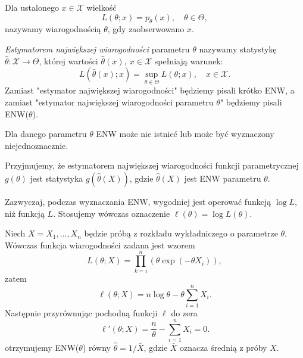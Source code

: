 	\begin{df}
		Dla ustalonego $x \in \mathcal{X}$ wielkość
		\begin{equation*}
			L(\theta; x) = p_{\theta}(x), \quad \theta \in \Theta,
		\end{equation*}
		nazywamy wiarogodnością $\theta$, gdy zaobserwowano $x$.
	\end{df}
	
	\begin{df}
		\textit{Estymatorem największej wiarogodności} parametru $\theta$ nazywamy statystykę $\hat{\theta}: \mathcal{X} \to \Theta$, której wartości $\hat{\theta}(x), \ x \in \mathcal{X}$ spełniają warunek:
		\begin{equation*}
			L(\hat{\theta}(x); x) = \sup_{\theta \in \Theta} L(\theta; x), \quad x \in \mathcal{X}.
		\end{equation*}		
		Zamiast "estymator największej wiarogodności" będziemy pisali krótko ENW, a zamiast "estymator największej wiarogodności parametru $\theta$" będziemy pisali ENW($\theta$).
		
	\end{df}
	\begin{uwg}
		Dla danego parametru $\theta$ ENW może nie istnieć lub może być wyznaczony niejednoznacznie.
	\end{uwg}
	\begin{uwg}
		Przyjmujemy, że estymatorem największej wiarogodności funkcji parametrycznej $g(\theta)$ jest statystyka $g(\hat{\theta}(X))$, gdzie $\hat{\theta}(X)$ jest ENW parametru $\theta$.
	\end{uwg}

	Zazwyczaj, podczas wyznaczania ENW, wygodniej jest operować funkcją $\log L$, niż funkcją $L$. Stosujemy wówczas oznaczenie $\ell(\theta) = \log L(\theta)$.
	
	\begin{przyk}
		Niech $X = X_1, \ldots, X_n$ będzie próbą z rozkładu wykładniczego o parametrze $\theta$. Wówczas funkcja wiarogodności zadana jest wzorem
		\begin{equation*}
			L(\theta; X) = \prod_{k=i}^{n}(\theta \exp(-\theta X_i)),
		\end{equation*}
		zatem
		\begin{equation*}
			\ell(\theta;  X) = n \log \theta - \theta \sum_{i=1}^{n} X_i.
		\end{equation*}
		Następnie przyrównując pochodną funkcji $\ell$ do zera
		\begin{equation*}
			\ell'(\theta; X) = \frac{n}{\theta} - \sum_{i=1}^{n} X_i = 0.
		\end{equation*}
		otrzymujemy ENW($\theta$) równy $\hat{\theta} = 1/\bar{X}$, gdzie $\bar{X}$ oznacza średnią z próby $X$.

	\end{przyk}
	

